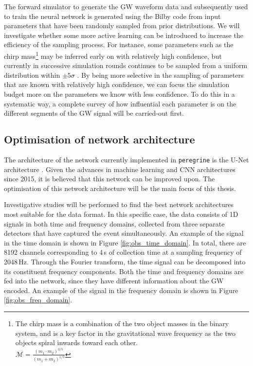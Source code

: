 The forward simulator to generate the GW waveform data and subsequently used to train the neural network is generated using the Bilby code \cite{Ashton_Bilby_2019} from input parameters that have been randomly sampled from prior distributions. We will investigate whether some more active learning can be introduced to increase the efficiency of the sampling process. For instance, some parameters such as the chirp mass\footnote{The chirp mass is a combination of the two object masses in the binary system, and is a key factor in the gravitational wave frequency as the two objects spiral inwards toward each other.\\$\mathcal{M} = \frac{(m_1 \cdot m_2)^{3/5}}{(m_1 + m_2)^{1/5}}$} may be inferred early on with relatively high confidence, but currently in successive simulation rounds continues to be sampled from a uniform distribution within $\pm5\sigma$ \cite{Miller_TMNRE_2021}. By being more selective in the sampling of parameters that are known with relatively high confidence, we can focus the simulation budget more on the parameters we know with less confidence. To do this in a systematic way, a complete survey of how influential each parameter is on the different segments of the GW signal will be carried-out first.

\subsection{Optimisation of network architecture}

The architecture of the network currently implemented in \texttt{peregrine} is the U-Net architecture \cite{Ronneberger_UNet_2015}. Given the advances in machine learning and CNN architectures since 2015, it is believed that this network can be improved upon. The optimisation of this network architecture will be the main focus of this thesis. 

Investigative studies will be performed to find the best network architectures most suitable for the data format. In this specific case, the data consists of 1D signals in both time and frequency domains, collected from three separate detectors that have captured the event simultaneously. An example of the signal in the time domain is shown in Figure \ref{fig:obs_time_domain}. In total, there are 8192 channels corresponding to 4\,s of collection time at a sampling frequency of 2048\,Hz. Through the Fourier transform, the time signal can be decomposed into its constituent frequency components. Both the time and frequency domains are fed into the network, since they have different information about the GW encoded. An example of the signal in the frequency domain is shown in Figure \ref{fig:obs_freq_domain}.

